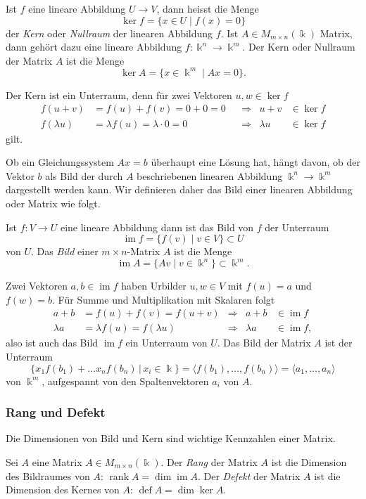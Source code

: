 \begin{definition}
%
Ist $f$ eine lineare Abbildung $U\to V$, dann heisst die Menge
\[
\ker f
=
\{x\in U\;|\; f(x)=0\}
\]
der {\em Kern} oder {\em Nullraum} der linearen Abbildung $f$.
%
%
Ist $A \in M_{m\times n}(\Bbbk)$ Matrix, dann gehört dazu eine lineare
Abbildung $f\colon\Bbbk^n\to\Bbbk^m$.
Der Kern oder Nullraum der Matrix $A$ ist die Menge
\[
\ker A
=
\{ x\in\Bbbk^m \;|\; Ax=0\}.
\]
\end{definition}

Der Kern ist ein Unterraum, denn für zwei Vektoren $u,w\in \ker f$
\[
\begin{aligned}
f(u+v)&=f(u) + f(v) = 0+0 = 0 &&\Rightarrow& u+v&\in\ker f\\
f(\lambda u)&=\lambda f(u) = \lambda\cdot 0=0&&\Rightarrow& \lambda u&\in\ker f
\end{aligned}
\]
gilt.

Ob ein Gleichungssystem $Ax=b$ überhaupt eine Lösung hat, hängt davon,
ob der Vektor $b$ als Bild der durch $A$ beschriebenen linearen Abbildung
$\Bbbk^n \to \Bbbk^m$ dargestellt werden kann.
Wir definieren daher das Bild einer linearen Abbildung oder Matrix
wie folgt.

\begin{definition}
Ist $f\colon V\to U$ eine lineare Abbildung dann ist das Bild von $f$
der Unterraum
\[
\operatorname{im}f = \{ f(v)\;|\;v\in V\} \subset U
\]
von $U$.
Das {\em Bild} einer $m\times n$-Matrix $A$ ist die Menge
\[
\operatorname{im}A = \{ Av \;|\; v\in\Bbbk^n\} \subset \Bbbk^m.
\]
\end{definition}
%

Zwei Vektoren $a,b\in\operatorname{im} f$ haben Urbilder $u,w\in V$ mit
$f(u)=a$ und $f(w)=b$.
Für Summe und Multiplikation mit Skalaren folgt
\[
\begin{aligned}
a+b       &= f(u)+f(v)=f(u+v)           & \Rightarrow &       a+b &\in\operatorname{im}f\\
\lambda a &=\lambda f(u) = f(\lambda u) & \Rightarrow & \lambda a &\in\operatorname{im}f,
\end{aligned}
\]
also ist auch das Bild $\operatorname{im}f$ ein Unterraum von $U$.
Das Bild der Matrix $A$ ist der Unterraum
\[
\{ x_1f(b_1) + \dots x_n f(b_n) \,|\, x_i\in\Bbbk\}
=
\langle f(b_1),\dots,f(b_n)\rangle
=
\langle a_1,\dots,a_n\rangle
\]
von $\Bbbk^m$, aufgespannt von den Spaltenvektoren $a_i$ von $A$.

\subsubsection{Rang und Defekt}
Die Dimensionen von Bild und Kern sind wichtige Kennzahlen einer Matrix.
\begin{definition}
Sei $A$ eine Matrix $A\in M_{m\times n}(\Bbbk)$.
Der {\em Rang} der Matrix $A$ ist die Dimension des Bildraumes von $A$:
$\operatorname{rank}A=\dim\operatorname{im} A$.
%
%
Der {\em Defekt} der Matrix $A$ ist die Dimension des Kernes von $A$:
$\operatorname{def}A=\dim\ker A$.
%
\end{definition}

